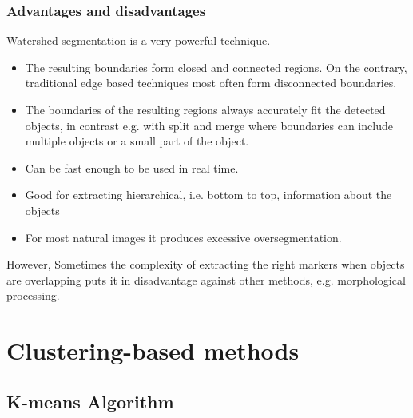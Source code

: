 \documentclass[a4paper]{article}
\begin{document}
\subsubsection{Advantages and disadvantages}
Watershed segmentation is a very powerful technique.
\begin{multicols}{2}
\begin{itemize}
    \item[\textcolor{DarkPink}{\ding{51}}] The resulting boundaries form closed and
connected regions. On the contrary, traditional edge based
techniques most often form disconnected
boundaries.
    \item[\textcolor{DarkPink}{\ding{51}}] The boundaries of the resulting regions always accurately fit the detected objects, in contrast e.g. with split and merge where boundaries can include multiple objects or a small part of the object.
    \item [\textcolor{DarkPink}{\ding{51}}]Can be fast enough to be used in real time.
    \item [\textcolor{DarkPink}{\ding{51}}]Good for extracting hierarchical, i.e. bottom to top, information about the objects
\end{itemize}

\columnbreak
\begin{itemize}
    \item[\textcolor{DarkPink}{\ding{55}}] For most natural images it produces excessive oversegmentation.
\end{itemize}
\end{multicols}
However, Sometimes the complexity of extracting the right markers when objects are overlapping puts it in disadvantage against other methods, e.g. morphological processing.


\section{Clustering-based methods}

\subsection{K-means Algorithm}
\end{document}
